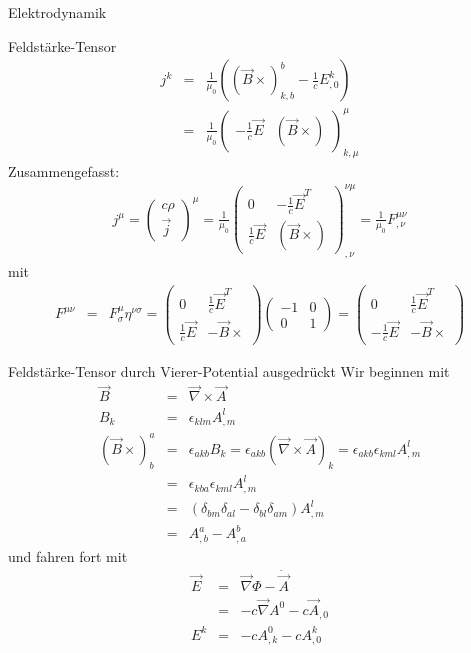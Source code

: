 \begin{chapter}{\titlestr}
\begin{section}{Elektrodynamik}
\begin{subsection}{Feldstärke-Tensor}
\begin{eqnarray*}
j^k &=& \frac{1}{\mu_0}\left(\left(\vec{B}\times\right)^b_{k,b}-\frac{1}{c}E^k_{,0}\right)\\
&=&\frac{1}{\mu_0}\begin{pmatrix}
-\frac{1}{c}\vec{E} & \left(\vec{B}\times\right)
\end{pmatrix}^\mu_{k,\mu}
\end{eqnarray*}
Zusammengefasst:
\begin{eqnarray}
\label{cov_inh_maxwell_eqns}
j^\mu=
\begin{pmatrix}
c\rho\\
\vec{j}
\end{pmatrix}^\mu
= \frac{1}{\mu_0}\begin{pmatrix}
0 & -\frac{1}{c}\vec{E}^T\\
\frac{1}{c}\vec{E} &\left(\vec{B}\times\right)
\end{pmatrix}^{\nu\mu}_{,\nu}=\frac{1}{\mu_0}F^{\mu\nu}_{,\nu}
\end{eqnarray}
mit
\begin{eqnarray*}
F^{\mu\nu} &=& F^\mu_\sigma\eta^{\nu\sigma} =\begin{pmatrix}
0 &\frac{1}{c}\vec{E}^T\\
\frac{1}{c}\vec{E} &-\vec{B}\times
\end{pmatrix}
\begin{pmatrix}
-1 & 0\\
0 & 1
\end{pmatrix}=\begin{pmatrix}
0 &\frac{1}{c}\vec{E}^T\\
-\frac{1}{c}\vec{E} &-\vec{B}\times
\end{pmatrix}
\end{eqnarray*}

\end{subsection}

\begin{subsection}{Feldstärke-Tensor durch Vierer-Potential ausgedrückt}
\label{field_strength_by_A}
Wir beginnen mit
\begin{eqnarray*}
\vec{B} &=& \vec{\nabla}\times \vec{A}\\
B_k &=& \epsilon_{klm}A^l_{,m}\\
\left(\vec{B}\times\right)_b^a &=& \epsilon_{akb}B_k=\epsilon_{akb}\left(\vec{\nabla}\times\vec{A}\right)_k=\epsilon_{akb}\epsilon_{kml}A^l_{,m}\\
&=& \epsilon_{kba}\epsilon_{kml}A^l_{,m}\\
&=&\left(\delta_{bm}\delta_{al}-\delta_{bl}\delta_{am}\right)A^l_{,m}\\
&=&A^a_{,b}-A^b_{,a}
\end{eqnarray*}
und fahren fort mit
\begin{eqnarray*}
\vec{E} &=& \vec{\nabla}\Phi-\dot{\vec{A}}\\
&=&-c\vec{\nabla}A^0-c\vec{A}_{,0}\\
E^k &=& -cA^0_{,k}-cA^k_{,0}
\end{eqnarray*}
\end{subsection}


\end{section}
\end{chapter}
